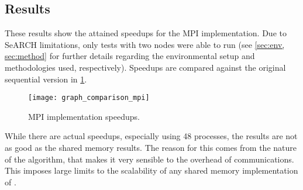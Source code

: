 \subsection{Results}
\label{sec:mpi:results}

These results show the attained speedups for the MPI implementation.
Due to SeARCH limitations, only tests with two nodes were able to run (see \cref{sec:env, sec:method} for further details regarding the environmental setup and methodologies used, respectively).
Speedups are compared against the original sequential version in \cref{fig:mpi:results}.

\begin{figure}[!htp]
	\centering
	\texttt{[image: graph\_comparison\_mpi]}
	\caption{MPI implementation speedups.}
	\label{fig:mpi:results}
\end{figure}

While there are actual speedups, especially using 48 processes, the results are not as good as the shared memory results.
The reason for this comes from the nature of the algorithm, that makes it very sensible to the overhead of communications.
This imposes large limits to the scalability of any shared memory implementation of \polu.

